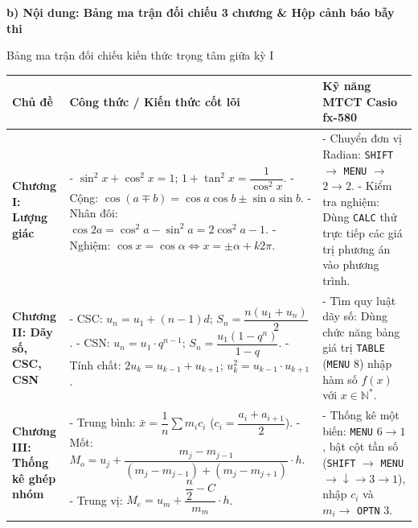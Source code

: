 \documentclass[12pt, a4paper]{article}
\begin{document}
\noindent \textbf{b) Nội dung: Bảng ma trận đối chiếu 3 chương \& Hộp cảnh báo bẫy thi}
\begin{pedabox}{Bảng ma trận đối chiếu kiến thức trọng tâm giữa kỳ I}
\begin{center}
\small
\begin{tabularx}{\textwidth}{|p{2.8cm}|X|X|}
\hline
\textbf{Chủ đề} & \textbf{Công thức / Kiến thức cốt lõi} & \textbf{Kỹ năng MTCT Casio fx-580} \\ \hline
\textbf{Chương I: Lượng giác} & 
- $\sin^2 x + \cos^2 x = 1$; $1 + \tan^2 x = \dfrac{1}{\cos^2 x}$. \newline
- Cộng: $\cos(a \mp b) = \cos a \cos b \pm \sin a \sin b$. \newline
- Nhân đôi: $\cos 2a = \cos^2 a - \sin^2 a = 2\cos^2 a - 1$. \newline
- Nghiệm: $\cos x = \cos \alpha \iff x = \pm \alpha + k2\pi$. &
- Chuyển đơn vị Radian: \texttt{SHIFT} $\to$ \texttt{MENU} $\to$ $2 \to 2$. \newline
- Kiểm tra nghiệm: Dùng \texttt{CALC} thử trực tiếp các giá trị phương án vào phương trình. \\ \hline
\textbf{Chương II: Dãy số, CSC, CSN} & 
- CSC: $u_n = u_1 + (n-1)d$; $S_n = \dfrac{n(u_1 + u_n)}{2}$. \newline
- CSN: $u_n = u_1 \cdot q^{n-1}$; $S_n = \dfrac{u_1(1 - q^n)}{1 - q}$. \newline
- Tính chất: $2u_k = u_{k-1} + u_{k+1}$; $u_k^2 = u_{k-1} \cdot u_{k+1}$. &
- Tìm quy luật dãy số: Dùng chức năng bảng giá trị \texttt{TABLE} (\texttt{MENU} $8$) nhập hàm số $f(x)$ với $x \in \mathbb{N}^*$. \\ \hline
\textbf{Chương III: Thống kê ghép nhóm} & 
- Trung bình: $\bar{x} = \dfrac{1}{n}\sum m_i c_i$ ($c_i = \dfrac{a_i + a_{i+1}}{2}$). \newline
- Mốt: $M_o = u_j + \dfrac{m_j - m_{j-1}}{(m_j - m_{j-1}) + (m_j - m_{j+1})} \cdot h$. \newline
- Trung vị: $M_e = u_m + \dfrac{\dfrac{n}{2} - C}{m_m} \cdot h$. &
- Thống kê một biến: \texttt{MENU} $6 \to 1$, bật cột tần số (\texttt{SHIFT} $\to$ \texttt{MENU} $\to \downarrow \to 3 \to 1$), nhập $c_i$ và $m_i \to$ \texttt{OPTN} $3$. \\ \hline
\end{tabularx}
\end{center}
\end{pedabox}
\end{document}
